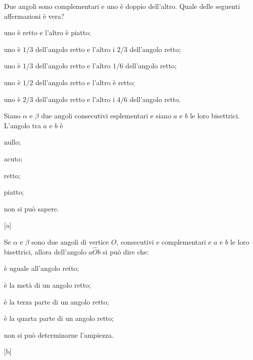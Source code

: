 \begin{esercizio}
\label{ese:1.66}
Due angoli sono complementari e uno è doppio dell'altro. Quale delle 
seguenti affermazioni è vera?
\vspace{-.5em}
\begin{enumeratea}
\item uno è retto e l'altro è piatto;
\item uno è $1/3$ dell'angolo retto e l'altro i $2/3$ dell'angolo 
retto;
\item uno è $1/3$ dell'angolo retto e l'altro $1/6$ dell'angolo retto;
\item uno è $1/2$ dell'angolo retto e l'altro è retto;
\item uno è $2/3$ dell'angolo retto e l'altro i $4/6$ dell'angolo 
retto.
\end{enumeratea}
\end{esercizio}

\begin{esercizio}
\label{ese:1.67}
Siano $\alpha$ e $\beta$ due angoli consecutivi esplementari e siano 
$a$ e $b$ le loro bisettrici. L'angolo tra $a$ e $b$ è
\vspace{-.5em}
\begin{multicols}{3}
\begin{enumeratea}
\item nullo;
\item acuto;
\item retto;
\item piatto;
\item non si può sapere.
\end{enumeratea}
\end{multicols}
\vspace{-18pt}
\hfill[a]
\end{esercizio}

\begin{esercizio}
\label{ese:1.68}
Se $\alpha$ e $\beta$ sono due angoli di vertice $O$, consecutivi e 
complementari e $a$ e $b$ le loro bisettrici, allora dell'angolo 
$a\widehat{O}b$ si può dire  che:
\vspace{-.5em}
\begin{multicols}{2}
\begin{enumeratea}
\item è uguale all'angolo retto;
\item è la metà di un angolo retto;
\item è la terza parte di un angolo retto;
\item è la quarta parte di un angolo retto;
\item non si può determinarne l'ampiezza.
\end{enumeratea}
\end{multicols}
\vspace{-18pt}
\hfill[b]
\end{esercizio}

